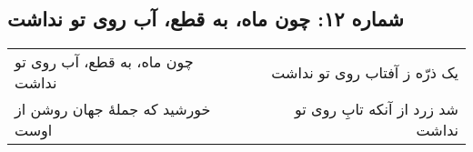 \begin{center}
\section*{شماره ۱۲: چون ماه، به قطع، آب روی تو نداشت}
\label{sec:012}
\begin{longtable}{l p{0.5cm} r}
چون ماه، به قطع، آب روی تو نداشت
&&
یک ذرّه ز آفتاب روی تو نداشت
\\
خورشید که جملهٔ جهان روشن از اوست
&&
شد زرد از آنکه تابِ روی تو نداشت
\\
\end{longtable}
\end{center}
